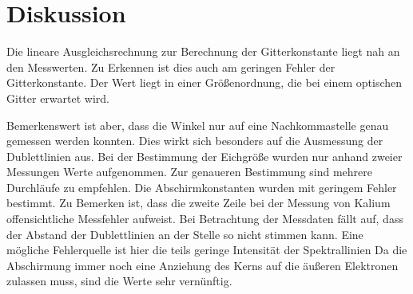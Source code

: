 \section{Diskussion}
\label{sec:Diskussion}

Die lineare Ausgleichsrechnung zur Berechnung der Gitterkonstante liegt nah an
den Messwerten.
Zu Erkennen ist dies auch am geringen Fehler der Gitterkonstante. Der Wert liegt
in einer Größenordnung, die bei einem optischen Gitter erwartet wird.

Bemerkenswert ist aber, dass die Winkel nur auf eine Nachkommastelle genau gemessen
werden konnten. Dies wirkt sich besonders auf die Ausmessung der Dublettlinien aus.
Bei der Bestimmung der Eichgröße wurden nur anhand zweier Messungen Werte aufgenommen.
Zur genaueren Bestimmung sind mehrere Durchläufe zu empfehlen.
Die Abschirmkonstanten wurden mit geringem Fehler bestimmt. Zu Bemerken ist, dass
die zweite Zeile bei der Messung von Kalium offensichtliche Messfehler aufweist.
Bei Betrachtung der Messdaten fällt auf, dass der Abstand der Dublettlinien an der Stelle
so nicht stimmen kann. Eine mögliche Fehlerquelle ist hier die teils geringe
Intensität der Spektrallinien
Da die Abschirmung immer noch eine Anziehung des Kerns auf die äußeren Elektronen
zulassen muss, sind die Werte sehr vernünftig.
